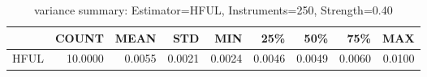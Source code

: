 \begin{table}[ht]
\centering
\caption{variance summary: Estimator=HFUL, Instruments=250, Strength=0.40}
\begin{tabular}{lrrrrrrrr}
\toprule
 & COUNT & MEAN & STD & MIN & 25\% & 50\% & 75\% & MAX \\
\midrule
HFUL & 10.0000 & 0.0055 & 0.0021 & 0.0024 & 0.0046 & 0.0049 & 0.0060 & 0.0100 \\
\bottomrule
\end{tabular}
\end{table}
